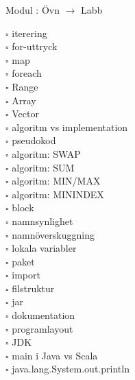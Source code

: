 
    Modul : Övn  $\rightarrow$ Labb \Alert{\texttt{--}}
    \begin{multicols}{3}\SlideFontTiny
    $\square$ iterering \\
$\square$ for-uttryck \\
$\square$ map \\
$\square$ foreach \\
$\square$ Range \\
$\square$ Array \\
$\square$ Vector \\
$\square$ algoritm vs implementation \\
$\square$ pseudokod \\
$\square$ algoritm: SWAP \\
$\square$ algoritm: SUM \\
$\square$ algoritm: MIN/MAX \\
$\square$ algoritm: MININDEX \\
$\square$ block \\
$\square$ namnsynlighet \\
$\square$ namnöverskuggning \\
$\square$ lokala variabler \\
$\square$ paket \\
$\square$ import \\
$\square$ filstruktur \\
$\square$ jar \\
$\square$ dokumentation \\
$\square$ programlayout \\
$\square$ JDK \\
$\square$ main i Java vs Scala \\
$\square$ java.lang.System.out.println \\
    \end{multicols}
    